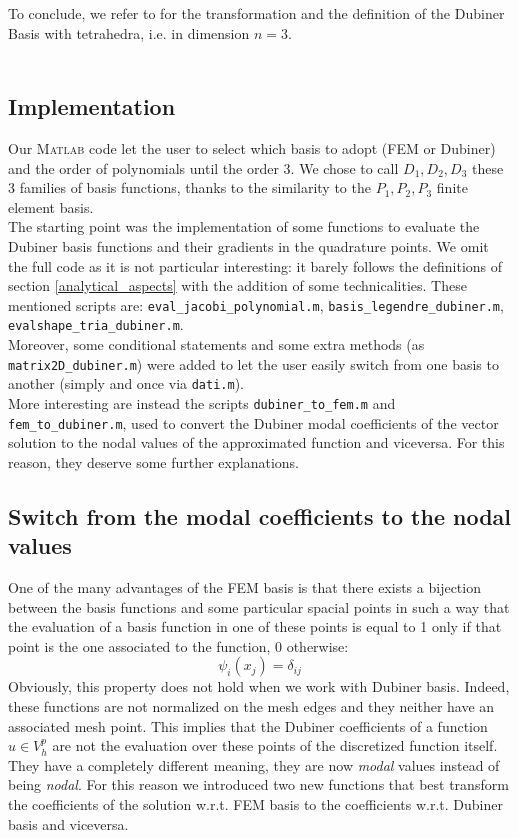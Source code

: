\documentclass[a4paper,11pt]{article}
\begin{document}
    \noindent To conclude, we refer to \cite{sherwin} for the transformation and the definition of the Dubiner Basis with tetrahedra, i.e. in dimension $n=3$.\\ \\
    
    \subsection{Implementation}\label{subsection_implementation}
    Our \textsc{Matlab} code let the user to select which basis to adopt (FEM or Dubiner) and the order of polynomials until the order 3. We chose to call $D_1,D_2,D_3$ these 3 families of basis functions, thanks to the similarity to the $P_1,P_2,P_3$ finite element basis.\\
    The starting point was the implementation of some functions to evaluate the Dubiner basis functions and their gradients in the quadrature points. We omit the full code as it is not particular interesting: it barely follows the definitions of section \ref{analytical_aspects} with the addition of some technicalities. These mentioned scripts are: \texttt{eval\_jacobi\_polynomial.m}, \texttt{basis\_legendre\_dubiner.m}, \texttt{evalshape\_tria\_dubiner.m}.\\
    
    \noindent Moreover, some conditional statements and some extra methods (as \texttt{matrix2D\_dubiner.m}) were added to let the user easily switch from one basis to another (simply and once via \texttt{dati.m}). \\
    
    \noindent More interesting are instead the scripts \texttt{dubiner\_to\_fem.m} and \texttt{fem\_to\_dubiner.m}, used to convert the Dubiner modal coefficients of the vector solution to the nodal values of the approximated function and viceversa. For this reason, they deserve some further explanations.
\subsection{Switch from the modal coefficients to the nodal values}
One of the many advantages of the FEM basis is that there exists a bijection between the basis functions and some particular spacial points in such a way that the evaluation of a basis function in one of these points is equal to 1 only if that point is the one associated to the function, 0 otherwise:
	\begin{equation} \label{ref1}
	\psi_i(x_j)=\delta_{ij}
	\end{equation}
	Obviously, this property does not hold when we work with Dubiner basis. Indeed, these functions are not normalized on the mesh edges and they neither have an associated mesh point. This implies that the Dubiner coefficients of a function $u\in V_h^p$ are not the evaluation over these points of the discretized function itself. They have a completely different meaning, they are now \emph{modal} values instead of being \emph{nodal}.
	For this reason we introduced two new functions that best transform the coefficients of the solution w.r.t. FEM basis to the coefficients w.r.t. Dubiner basis and viceversa.\vspace{5mm}
	
\end{document}
